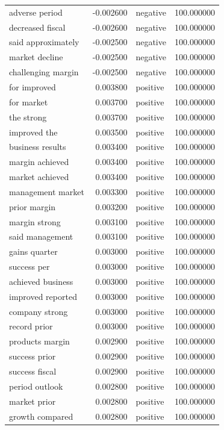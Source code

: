 \begin{table}
\begin{tabular}{lrlr}
adverse period & -0.002600 & negative & 100.000000 \\
decreased fiscal & -0.002600 & negative & 100.000000 \\
said approximately & -0.002500 & negative & 100.000000 \\
market decline & -0.002500 & negative & 100.000000 \\
challenging margin & -0.002500 & negative & 100.000000 \\
for improved & 0.003800 & positive & 100.000000 \\
for market & 0.003700 & positive & 100.000000 \\
the strong & 0.003700 & positive & 100.000000 \\
improved the & 0.003500 & positive & 100.000000 \\
business results & 0.003400 & positive & 100.000000 \\
margin achieved & 0.003400 & positive & 100.000000 \\
market achieved & 0.003400 & positive & 100.000000 \\
management market & 0.003300 & positive & 100.000000 \\
prior margin & 0.003200 & positive & 100.000000 \\
margin strong & 0.003100 & positive & 100.000000 \\
said management & 0.003100 & positive & 100.000000 \\
gains quarter & 0.003000 & positive & 100.000000 \\
success per & 0.003000 & positive & 100.000000 \\
achieved business & 0.003000 & positive & 100.000000 \\
improved reported & 0.003000 & positive & 100.000000 \\
company strong & 0.003000 & positive & 100.000000 \\
record prior & 0.003000 & positive & 100.000000 \\
products margin & 0.002900 & positive & 100.000000 \\
success prior & 0.002900 & positive & 100.000000 \\
success fiscal & 0.002900 & positive & 100.000000 \\
period outlook & 0.002800 & positive & 100.000000 \\
market prior & 0.002800 & positive & 100.000000 \\
growth compared & 0.002800 & positive & 100.000000 \\

\end{tabular}
\end{table}

